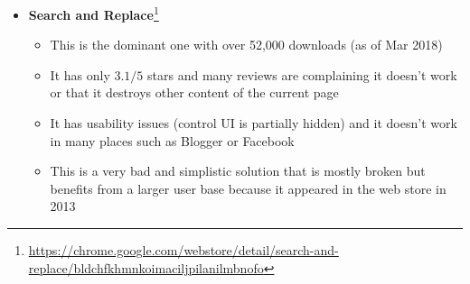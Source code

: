 \documentclass[bsc,frontabs,twoside,singlespacing,parskip,deptreport]{infthesis}
\providecommand{\tightlist}{%
  \setlength{\itemsep}{0pt}\setlength{\parskip}{0pt}}
\begin{document}
\begin{itemize}
\item
  {\bf Search and Replace}\footnote{\href{https://chrome.google.com/webstore/detail/search-and-replace/bldchfkhmnkoimaciljpilanilmbnofo}{https://chrome.google.com/webstore/detail/search-and-replace/bldchfkhmnkoimaciljpilanilmbnofo}}
  
  \begin{itemize}
  \tightlist
\item
  This is the dominant one with over 52,000 downloads (as of Mar 2018)
\item
  It has only $3.1/5$ stars and many reviews are complaining it doesn't work or that it destroys other content of the current page
\item
  It has usability issues (control UI is partially hidden) and it doesn't work in many places such as Blogger or Facebook
\item
  This is a very bad and simplistic solution that is mostly broken but benefits from a larger user base because it appeared in the web store in 2013
  \end{itemize}
  

\end{itemize}
\end{document}

